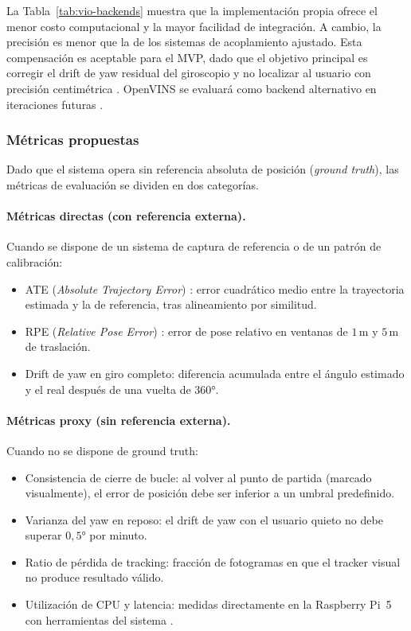 La Tabla~\ref{tab:vio-backends} muestra que la implementación propia ofrece
el menor costo computacional y la mayor facilidad de integración. A cambio,
la precisión es menor que la de los sistemas de acoplamiento ajustado. Esta
compensación es aceptable para el MVP, dado que el objetivo principal es
corregir el drift de yaw residual del giroscopio y no localizar al usuario con
precisión centimétrica \cite{Durrant-Whyte2006}. OpenVINS se evaluará como
backend alternativo en iteraciones futuras \cite{Mourikis2007}.

\subsubsection{Métricas propuestas}

Dado que el sistema opera sin referencia absoluta de posición (\emph{ground
truth}), las métricas de evaluación se dividen en dos categorías.

\paragraph{Métricas directas (con referencia externa).} Cuando se dispone de
un sistema de captura de referencia o de un patrón de calibración:
\begin{itemize}
  \item ATE (\emph{Absolute Trajectory Error}) \cite{sturm12iros}: error
    cuadrático medio entre la trayectoria estimada y la de referencia, tras
    alineamiento por similitud.
  \item RPE (\emph{Relative Pose Error}) \cite{sturm12iros}: error de pose
    relativo en ventanas de $1\,\text{m}$ y $5\,\text{m}$ de traslación.
  \item Drift de yaw en giro completo: diferencia acumulada entre el ángulo
    estimado y el real después de una vuelta de $360°$.
\end{itemize}

\paragraph{Métricas proxy (sin referencia externa).} Cuando no se dispone de
ground truth:
\begin{itemize}
  \item Consistencia de cierre de bucle: al volver al punto de partida
    (marcado visualmente), el error de posición debe ser inferior a un umbral
    predefinido.
  \item Varianza del yaw en reposo: el drift de yaw con el usuario quieto no
    debe superar $0{,}5°$ por minuto.
  \item Ratio de pérdida de tracking: fracción de fotogramas en que el tracker
    visual no produce resultado válido.
  \item Utilización de CPU y latencia: medidas directamente en la Raspberry
    Pi~5 con herramientas del sistema \cite{RaspberryPi}.
\end{itemize}


